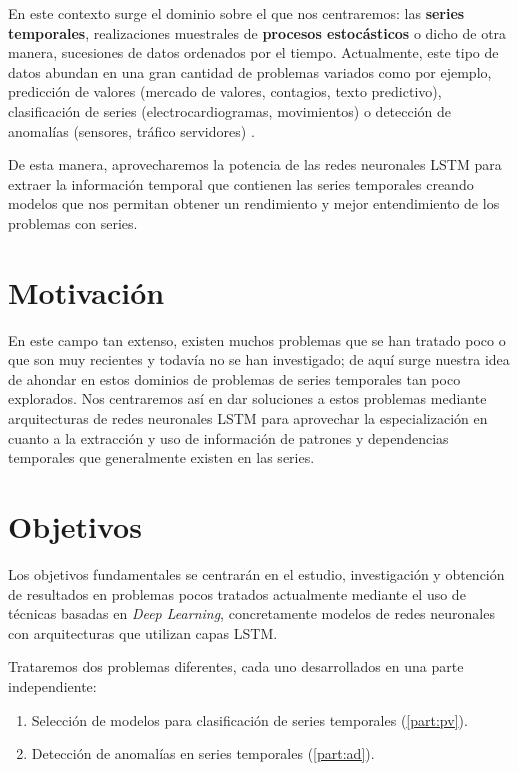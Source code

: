 En este contexto surge el dominio sobre el que nos centraremos: las \textbf{series temporales}, realizaciones muestrales de \textbf{procesos estocásticos} o dicho de otra manera, sucesiones de datos ordenados por el tiempo. Actualmente, este tipo de datos abundan en una gran cantidad de problemas variados como por ejemplo, predicción de valores (mercado de valores, contagios, texto predictivo), clasificación de series (electrocardiogramas, movimientos) o detección de anomalías (sensores, tráfico servidores) \cite{wang2017origin}.

De esta manera, aprovecharemos la potencia de las redes neuronales LSTM para extraer la información temporal que contienen las series temporales creando modelos que nos permitan obtener un rendimiento y mejor entendimiento de los problemas con series.

\section{Motivación}

En este campo tan extenso, existen muchos problemas que se han tratado poco o que son muy recientes y todavía no se han investigado; de aquí surge nuestra idea de ahondar en estos dominios de problemas de series temporales tan poco explorados. Nos centraremos así en dar soluciones a estos problemas mediante arquitecturas de redes neuronales LSTM para aprovechar la especialización en cuanto a la extracción y uso de información de patrones y dependencias temporales que generalmente existen en las series.

\section{Objetivos}

Los objetivos fundamentales se centrarán en el estudio, investigación y obtención de resultados en problemas pocos tratados actualmente mediante el uso de técnicas basadas en \emph{Deep Learning}, concretamente modelos de redes neuronales con arquitecturas que utilizan capas LSTM.

Trataremos dos problemas diferentes, cada uno desarrollados en una parte independiente:

\begin{enumerate}
  \item Selección de modelos para clasificación de series temporales (\autoref{part:pv}).
  \item Detección de anomalías en series temporales (\autoref{part:ad}).
\end{enumerate}

